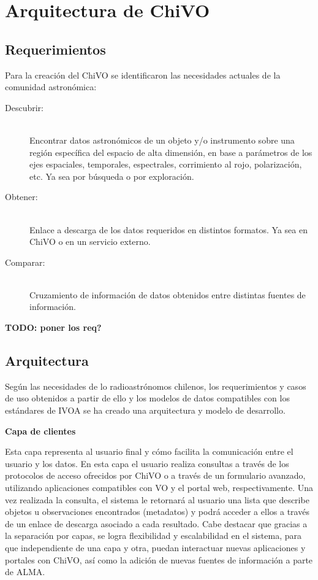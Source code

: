 \section{Arquitectura de ChiVO}

\subsection{Requerimientos}

Para la creación del ChiVO se identificaron las necesidades actuales de la comunidad
astronómica:

\begin{description}
    \item[Descubrir:] \hfill \\
        Encontrar datos astronómicos de un objeto y/o instrumento sobre una región
        específica del espacio de alta dimensión, en base a parámetros de los ejes
        espaciales, temporales, espectrales, corrimiento al rojo, polarización, etc.
        Ya sea por búsqueda o por exploración.
    \item[Obtener:] \hfill \\
        Enlace a descarga de los datos requeridos en distintos formatos.
        Ya sea en ChiVO o en un servicio externo.
    \item[Comparar:] \hfill \\
        Cruzamiento de información de datos obtenidos entre distintas fuentes de
        información.
\end{description}

\textbf{TODO: poner los req?}

\subsection{Arquitectura}

Según las necesidades de lo radioastrónomos chilenos, los requerimientos y casos de
uso obtenidos a partir de ello y los modelos de datos compatibles con los estándares
de IVOA se ha creado una arquitectura y modelo de desarrollo.


\textbf{Capa de clientes}

Esta capa representa al usuario final y cómo facilita la comunicación entre el
usuario y los datos.
En esta capa el usuario realiza consultas a través de los protocolos de acceso
ofrecidos por ChiVO o a través de un formulario avanzado, utilizando aplicaciones
compatibles con VO y el portal web, respectivamente.
Una vez realizada la consulta, el sistema le retornará al usuario una lista que
describe objetos u observaciones encontrados (metadatos) y podrá acceder a ellos a
través de un enlace de descarga asociado a cada resultado.
Cabe destacar que gracias a la separación por capas, se logra flexibilidad y
escalabilidad en el sistema, para que independiente de una capa y otra, puedan
interactuar nuevas aplicaciones y portales con ChiVO, así como la adición de nuevas
fuentes de información a parte de ALMA.

